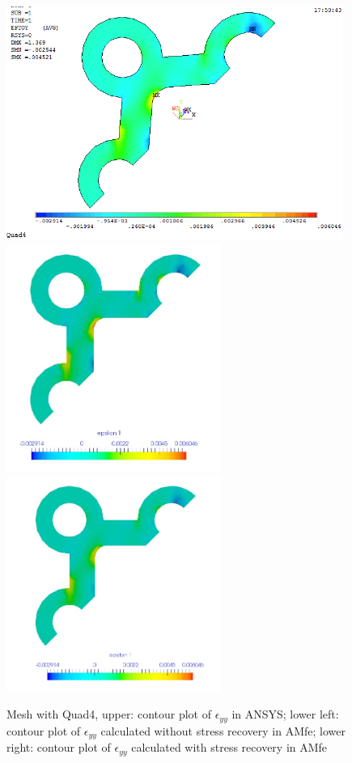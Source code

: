 \begin{figure}[htbp]
	\begin{center}
		\includegraphics[width=11cm,clip]{Quad4_Eyy.png} 	
		\includegraphics[width=7cm,clip]{Quad4_Eyy_PD.png} 		
		\includegraphics[width=7cm,clip]{Quad4_Eyy_P.png} 		
		\caption{Mesh with Quad4, upper: contour plot of $\epsilon_{yy}$ in ANSYS; lower left: contour plot of $\epsilon_{yy}$ calculated without stress recovery in AMfe; lower right: contour plot of $\epsilon_{yy}$ calculated with stress recovery in AMfe} \label{fig: Quad4_Eyy}
	\end{center}
\end{figure}
\clearpage 

